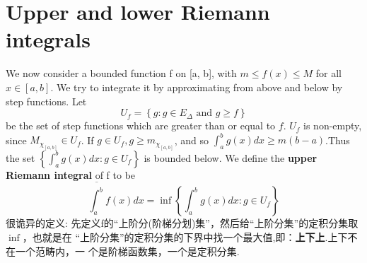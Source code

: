 \documentclass[12pt]{book}
\theoremstyle{definition}\newtheorem{dfn}{Définition}[chapter]
\theoremstyle{plain}\newtheorem{thm}{Théorème}[chapter]
\theoremstyle{plain}\newtheorem{prp}{Proposition}[chapter]
\theoremstyle{plain}\newtheorem{lem}{\bf Lemme}[chapter]
\theoremstyle{plain}\newtheorem{axm}{\bf Axiome}[chapter]
\theoremstyle{plain}\newtheorem{lmm}{\bf Lemme}[chapter]
\theoremstyle{plain}\newtheorem{cor}{\bf Corollaire}[chapter]
\theoremstyle{remark}\newtheorem{rem}{Remarque}[chapter]
\begin{document}
\section{Upper and lower Riemann integrals}
We now consider a bounded function f on [a, b], with $m \le f(x) \le M$ for all
$x \in [a, b].$  We try to integrate it by approximating from above and below by
step functions. Let
$$U_f = \left\{g : g \in E_{\Delta}\text{ and }g \ge f\right\}$$
be the set of step functions which are greater than or equal to $f$. $U_f$ is
non-empty, since $M_{\chi_{[a,b]}} \in U_f$. If $g \in U_f, g \ge m_{\chi_{[a,b]}}$, and so
$\int_{a}^{b}g(x) dx \ge m(b-a)$.Thus the set $\left\{\int^b_a g(x) dx : g \in U_f\right\}$ is bounded below. We define
the {\bf upper Riemann integral} of f to be
$$
\overline{\int^b_a}f(x)d x=\inf\left\{\int^b_a g(x) dx : g \in U_f\right\}
$$
很诡异的定义: 先定义f的“上阶分(阶梯分划)集”，然后给“上阶分集”的定积分集取$\inf$，也就是在
“上阶分集”的定积分集的下界中找一个最大值,即：{\bf 上下上}.上下不在一个范畴内，一
个是阶梯函数集，一个是定积分集.
\end{document}
